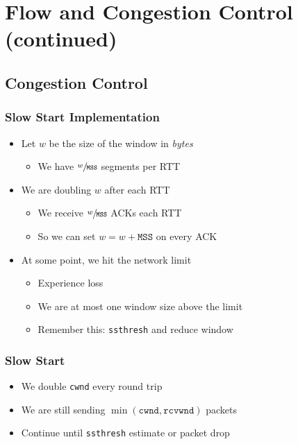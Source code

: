 \chapter{Flow and Congestion Control (continued)}
\section{Congestion Control}
\subsection{Slow Start Implementation}
\begin{itemize}[nosep]
    \item Let $w$ be the size of the window in \emph{bytes}
          \begin{itemize}[nosep]
              \item We have $\sfrac{w}{\texttt{MSS}}$ segments per RTT
          \end{itemize}
    \item We are doubling $w$ after each RTT
          \begin{itemize}[nosep]
              \item We receive $\sfrac{w}{\texttt{MSS}}$ ACKs each RTT
              \item So we can set $w = w + \texttt{MSS}$ on every ACK
          \end{itemize}
    \item At some point, we hit the network limit
          \begin{itemize}[nosep]
              \item Experience loss
              \item We are at most one window size above the limit
              \item Remember this: \texttt{ssthresh} and reduce window
          \end{itemize}
\end{itemize}

\subsection{Slow Start}
\begin{itemize}[nosep]
    \item We double \texttt{cwnd} every round trip
    \item We are still sending $\min(\texttt{cwnd}, \texttt{rcvwnd})$ packets
    \item Continue until \texttt{ssthresh} estimate or packet drop
\end{itemize}

